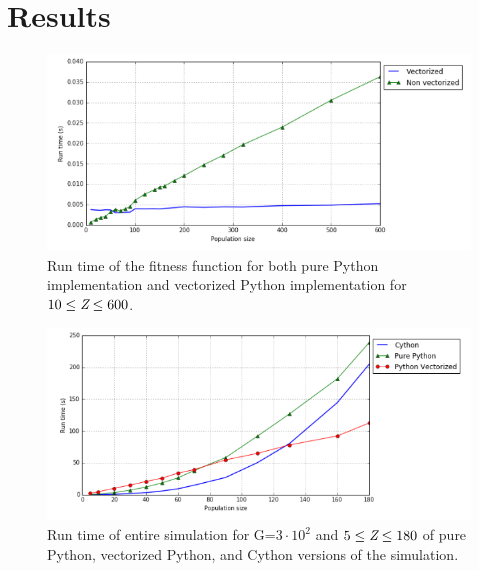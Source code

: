 \documentclass[10pt,a4paper]{article}
\begin{document}
\section{Results}
\begin{figure}[h!]
  \includegraphics[width=\linewidth]{Vectorized_python_speedup.PNG}
  \caption{Run time of the fitness function for both pure Python implementation and vectorized Python implementation for $10 \leq \emph{Z} \leq 600$.}
  \label{fig:Runtime1}
\end{figure}

\begin{figure}[h!]
  \includegraphics[width=\linewidth]{cython_python_vectorized_run_time.PNG}
  \caption{Run time of entire simulation for G=$3 \cdot 10^{2}$ and $5 \leq \emph{Z} \leq 180$ of pure Python, vectorized Python, and Cython versions of the simulation.}
  \label{fig:Runtime1}
\end{figure}
\end{document}
